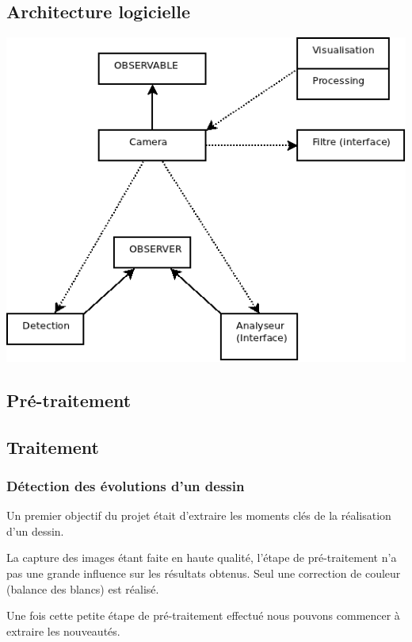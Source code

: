 \subsection{Architecture logicielle}

\begin{center}
\includegraphics[scale=0.66]{Archi/Architecture.png}
\end{center}

\subsection{Pré-traitement} %


\subsection{Traitement}
\subsubsection{Détection des évolutions d'un dessin}
Un premier objectif du projet était d'extraire les moments clés de la réalisation d'un dessin.

La capture des images étant faite en haute qualité, l'étape de pré-traitement n'a pas une grande influence sur les résultats obtenus. Seul une correction de couleur (balance des blancs) est réalisé.

Une fois cette petite étape de pré-traitement effectué nous pouvons commencer à extraire les nouveautés.


